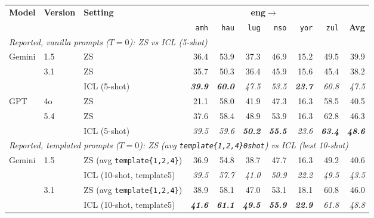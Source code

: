 \begin{table}[t]
\centering
\small
\renewcommand{\arraystretch}{1.05}
\begin{tabular}{lllrrrrrrr}
\toprule
\textbf{Model} & \textbf{Version} & \textbf{Setting} & \multicolumn{6}{c}{\textbf{eng$\to$}} & \\
\cmidrule(lr){4-9}
   &    &    & \texttt{amh} & \texttt{hau} & \texttt{lug} & \texttt{nso} & \texttt{yor} & \texttt{zul} & \textbf{Avg} \\
\midrule
\multicolumn{10}{l}{\textit{Reported, vanilla prompts ($T{=}0$): ZS vs ICL (5-shot)}} \\
\midrule
\multirow{3}{*}{Gemini} & \multirow{1}{*}{1.5} & ZS & 36.4 & 53.9 & 37.3 & 46.9 & 15.2 & 49.5 & 39.9 \\
\cmidrule(lr){2-10}
 & \multirow{2}{*}{3.1} & ZS & 35.7 & 50.3 & 36.4 & 45.9 & 15.6 & 45.4 & 38.2 \\
 &  & ICL (5-shot) & \textbf{\emph{39.9}} & \textbf{\emph{60.0}} & \emph{47.5} & \emph{53.5} & \textbf{\emph{23.7}} & \emph{60.8} & \emph{47.5} \\
\cmidrule(lr){1-10}
\multirow{3}{*}{GPT} & \multirow{1}{*}{4o} & ZS & 21.1 & 58.0 & 41.9 & 47.3 & 16.3 & 58.5 & 40.5 \\
\cmidrule(lr){2-10}
 & \multirow{2}{*}{5.4} & ZS & 37.6 & 58.4 & 48.9 & 53.9 & 16.3 & 62.8 & 46.3 \\
 &  & ICL (5-shot) & \emph{39.5} & \emph{59.6} & \textbf{\emph{50.2}} & \textbf{\emph{55.5}} & \emph{23.6} & \textbf{\emph{63.4}} & \textbf{\emph{48.6}} \\
\midrule\midrule
\multicolumn{10}{l}{\textit{Reported, templated prompts ($T{=}0$): ZS (avg \texttt{template\{1,2,4\}\textunderscore{}0shot}) vs ICL (best 10-shot)}} \\
\midrule
\multirow{4}{*}{Gemini} & \multirow{2}{*}{1.5} & ZS (avg \texttt{template\{1,2,4\}}) & 36.9 & 54.8 & 38.7 & 47.7 & 16.3 & 49.2 & 40.6 \\
 &  & ICL (10-shot, template5) & \emph{39.5} & \emph{57.7} & \emph{41.0} & \emph{50.9} & \emph{22.2} & \emph{49.5} & \emph{43.5} \\
\cmidrule(lr){2-10}
 & \multirow{2}{*}{3.1} & ZS (avg \texttt{template\{1,2,4\}}) & 38.9 & 58.1 & 47.0 & 53.1 & 18.1 & 60.8 & 46.0 \\
 &  & ICL (10-shot, template5) & \textbf{\emph{41.6}} & \textbf{\emph{61.1}} & \textbf{\emph{49.5}} & \textbf{\emph{55.9}} & \textbf{\emph{22.9}} & \emph{61.8} & \emph{48.8} \\

\end{tabular}
\end{table}
